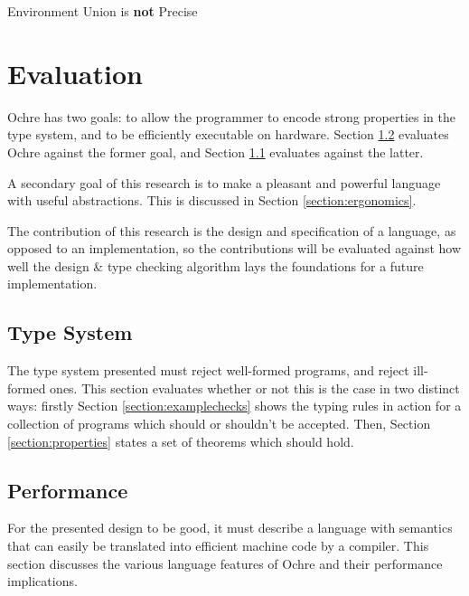 \documentclass[12pt,twoside]{report}
\begin{document}
\begin{Property}{Environment Union is \textbf{not} Precise}{}
\end{Property}
\label{theorem:inpreciseenvunion}


\chapter{Evaluation}
Ochre has two goals: to allow the programmer to encode strong properties in the type system, and to be efficiently executable on hardware. Section \ref{section:performance} evaluates Ochre against the former goal, and Section \ref{section:typesystem} evaluates against the latter.

A secondary goal of this research is to make a pleasant and powerful language with useful abstractions. This is discussed in Section \ref{section:ergonomics}.

The contribution of this research is the design and specification of a language, as opposed to an implementation, so the contributions will be evaluated against how well the design \& type checking algorithm lays the foundations for a future implementation.

\section{Type System}
\label{section:typesystem}
The type system presented must reject well-formed programs, and reject ill-formed ones. This section evaluates whether or not this is the case in two distinct ways: firstly Section \ref{section:examplechecks} shows the typing rules in action for a collection of programs which should or shouldn't be accepted. Then, Section \ref{section:properties} states a set of theorems which should hold.

\section{Performance}
\label{section:performance}
For the presented design to be good, it must describe a language with semantics that can easily be translated into efficient machine code by a compiler. This section discusses the various language features of Ochre and their performance implications.
\end{document}
